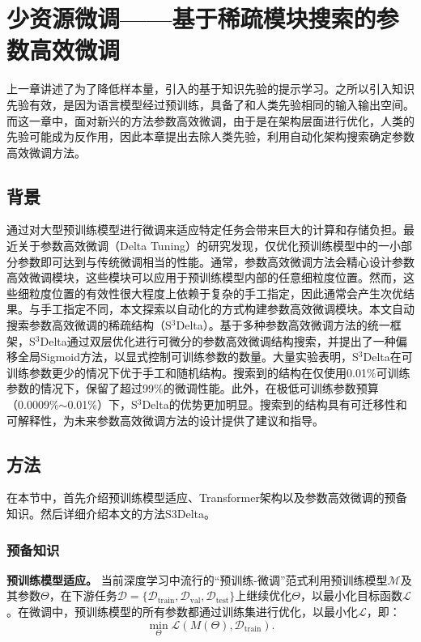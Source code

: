 \chapter{少资源微调——基于稀疏模块搜索的参数高效微调}

上一章讲述了为了降低样本量，引入的基于知识先验的提示学习。之所以引入知识先验有效，是因为语言模型经过预训练，具备了和人类先验相同的输入输出空间。而这一章中，面对新兴的方法参数高效微调，由于是在架构层面进行优化，人类的先验可能成为反作用，因此本章提出去除人类先验，利用自动化架构搜索确定参数高效微调方法。

\section{背景}

通过对大型预训练模型进行微调来适应特定任务会带来巨大的计算和存储负担。最近关于参数高效微调（Delta Tuning）的研究发现，仅优化预训练模型中的一小部分参数即可达到与传统微调相当的性能。通常，参数高效微调方法会精心设计参数高效微调模块，这些模块可以应用于预训练模型内部的任意细粒度位置。然而，这些细粒度位置的有效性很大程度上依赖于复杂的手工指定，因此通常会产生次优结果。与手工指定不同，本文探索以自动化的方式构建参数高效微调模块。本文自动搜索参数高效微调的稀疏结构（S$^3$Delta）。基于多种参数高效微调方法的统一框架，S$^3$Delta通过双层优化进行可微分的参数高效微调结构搜索，并提出了一种偏移全局Sigmoid方法，以显式控制可训练参数的数量。大量实验表明，S$^3$Delta在可训练参数更少的情况下优于手工和随机结构。搜索到的结构在仅使用0.01\%可训练参数的情况下，保留了超过99\%的微调性能。此外，在极低可训练参数预算（0.0009\%$\sim$0.01\%）下，S$^3$Delta的优势更加明显。搜索到的结构具有可迁移性和可解释性，为未来参数高效微调方法的设计提供了建议和指导。


\section{方法}
在本节中，首先介绍预训练模型适应、Transformer架构以及参数高效微调的预备知识。然后详细介绍本文的方法S3Delta。

\subsection{预备知识}
\label{sec:meth:preliminaries}
\textbf{预训练模型适应。} 当前深度学习中流行的“预训练-微调”范式利用预训练模型$\mathcal{M}$及其参数$\Theta$，在下游任务$\mathcal{D}=\{\mathcal{D}_{\text{train}}, \mathcal{D}_{\text{val}}, \mathcal{D}_{\text{test}}\}$上继续优化$\Theta$，以最小化目标函数$\mathcal{L}$。在微调中，预训练模型的所有参数都通过训练集进行优化，以最小化$\mathcal{L}$，即：
\begin{equation}
   \operatorname{min}_\Theta \mathcal{L}(M(\Theta), \mathcal{D}_{\text{train}}).
\end{equation}

